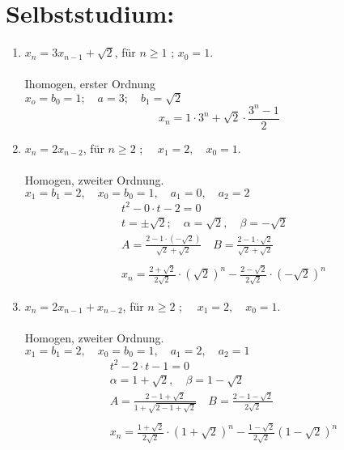     \section*{Selbststudium:}
    \begin{enumerate}[label=(\alph*)]
    	\item $x_n = 3x_{n-1}+ \sqrt{2}$, f\"ur $n \geq 1 $ ; $ x_0 = 1.$ \\ \\
    	Ihomogen, erster Ordnung \\
    	$ x_o = b_0 =1 ; \quad a=3; \quad b_1 = \sqrt{2} $ 
    	\[x_n =1 \cdot 3^n + \sqrt{2} \cdot \frac{3^n -1}{2} \]
    	
    	\item $x_n = 2x_{n-2}$, f\"ur $n \geq 2 $ ;  $\quad x_1 = 2, \quad x_0 =1 .$ \\ \\
    	Homogen, zweiter Ordnung.\\
    	$x_1 =b_1 = 2, \quad x_0=b_0=1, \quad a_1=0, \quad a_2=2$
    	\begin{align*}
    		&t^2-0 \cdot t -2 =0 \\
    		&t= \pm \sqrt{2} ; \quad \alpha = \sqrt{2}, \quad \beta = -\sqrt{2} \\
    		&A = \frac{2-1\cdot (-\sqrt{2})}{\sqrt{2}+\sqrt{2}} \quad B = \frac{2-1\cdot \sqrt{2}}{\sqrt{2}+\sqrt{2}} \\\\
    		&x_n = \frac{2+\sqrt{2}}{2\sqrt{2}} \cdot (\sqrt{2})^n - \frac{2-\sqrt{2}}{2\sqrt{2}} \cdot (-\sqrt{2})^n
    	\end{align*}
    	
    	\item $x_n = 2x_{n-1} +x_{n-2}$, f\"ur $n \geq 2 $ ;  $\quad x_1 = 2, \quad x_0 =1 .$ \\ \\
    	Homogen, zweiter Ordnung. \\
    	$x_1 =b_1 = 2, \quad x_0=b_0=1, \quad a_1=2, \quad a_2=1$\\
    	\begin{align*}
	    	&t^2-2 \cdot t -1 =0 \\
			&\alpha = 1+\sqrt{2}, \quad \beta = 1-\sqrt{2} \\
			&A= \frac{2-1+\sqrt{2}}{1+\sqrt{2-1+\sqrt{2}}} \quad B = \frac{2-1-\sqrt{2}}{2\sqrt{2}} \\ \\
			&x_n=\frac{1+\sqrt{2}}{2\sqrt{2}} \cdot(1+ \sqrt{2} )^n - \frac{1-\sqrt{2}}{2\sqrt{2}}(1-\sqrt{2})^n
    	\end{align*}
		

\end{enumerate}
